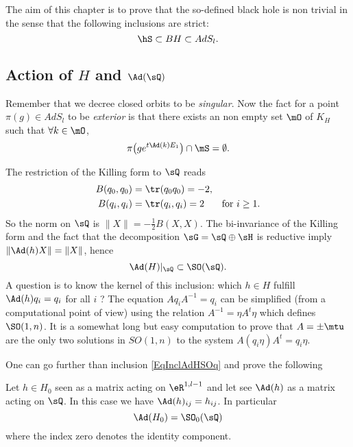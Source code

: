 The aim of this chapter is to prove that the so-defined black hole is non trivial in the sense that the following inclusions are strict:
\begin{equation}		\label{EqhSssubBH}
 \hS\subset BH\subset AdS_l.
 \end{equation}

\subsection{Action of \texorpdfstring{$H$}{H} and \texorpdfstring{$\Ad(\sQ)$}{AdQ}}

Remember that we decree closed orbits to be \emph{singular}. Now the fact for a point $\pi(g)\in AdS_l$ to be \emph{exterior} is that there exists an non empty set $\mO$ of $K_H$ such that $\forall k\in\mO$,
\[
  \pi\big( g e^{t\Ad(k)E_1}  \big)\cap\mS=\emptyset.
\]

The restriction of the Killing form to $\sQ$ reads
\begin{subequations}
\begin{align}
	B(q_0,q_0)&=\tr(q_0q_0)=-2,\\
	B(q_{i},q_{i})&=\tr(q_{i},q_{i})=2&\textrm{for $i\geq 1$}.
\end{align}
\end{subequations}
So the norm on $\sQ$ is $\| X \|=-\frac{ 1 }{2}B(X,X)$. The bi-invariance of the Killing form and the fact that the decomposition $\sG=\sQ\oplus\sH$ is reductive  imply $\| \Ad(h)X \|=\| X \|$, hence
\begin{equation}  \label{EqInclAdHSOq}
  \Ad(H)|_{\sQ}\subset\SO(\sQ).
\end{equation} 
A question is to know the kernel of this inclusion: which $h\in H$ fulfill $\Ad(h)q_i=q_i$ for all $i$ ? The equation $Aq_iA^{-1}=q_i$ can be simplified (from a computational point of view) using the relation $A^{-1}=\eta A^t\eta$ which defines $\SO(1,n)$. It is a somewhat long but easy computation to prove that $A=\pm\mtu$ are the only two solutions in $SO(1,n)$ to the system $A(q_i\eta)A^t=q_i\eta$.

One can go further than inclusion \eqref{EqInclAdHSOq} and prove the following
\begin{proposition}		
 Let $h\in H_0$ seen as a matrix acting on $\eR^{1,l-1}$ and let see $\Ad(h)$ as a matrix acting on $\sQ$. In this case we have $\Ad(h)_{ij}=h_{ij}$. In particular
\begin{equation}
   \Ad(H_0)=\SO_0(\sQ)
\end{equation} 
where the index zero denotes the identity component.
\label{PropSOADHequal}
\end{proposition}

